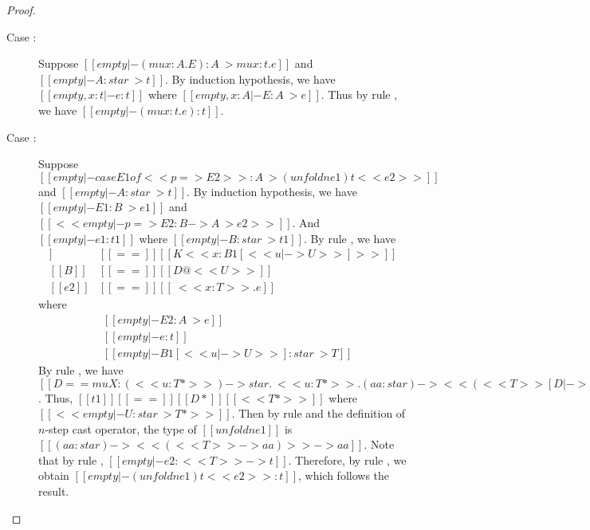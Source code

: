 \begin{proof}
\begin{description}
        \item[Case :] Suppose $[[empty |- (mu x:A . E):A ~> mu x:t.e]]$ and $[[empty |- A : star ~> t]]$. By induction hypothesis, we have $[[empty, x : t |- e : t]]$ where $[[empty, x:A |- E:A ~> e]]$. Thus by rule , we have $[[empty |- (mu x:t.e) : t]]$.
        \item[Case :] Suppose $[[empty |- case E1 of << p => E2 >> : A ~> (unfoldn e1) t <<e2>>]]$ and $[[empty |- A : star ~> t]]$. By induction hypothesis, we have $[[empty |- E1 : B ~> e1]]$ and $[[<< empty |- p => E2 : B -> A ~> e2 >>]]$. And $[[empty |- e1 : t1]]$ where $[[empty |- B : star ~> t1]]$. By rule , we have
        \begin{align*}
            [[p]] &[[==]] [[K <<x:B1[<< u |-> U >>]>>]] \\
            [[B]] &[[==]] [[D@<<U>>]] \\
            [[e2]] &[[==]] [[\ <<x:T>> .e]]
        \end{align*}
        where
        \begin{align*}
            &[[empty |- E2 : A ~> e]] \\
            &[[empty |- e : t]] \\
            &[[empty |- B1[<< u |-> U >>]:star ~> T ]]
        \end{align*}
        By rule , we have $[[D == mu X : (<<u:T*>>) -> star . \ <<u:T*>> . (aa:star) -> << (<<T>>[D |-> X] -> aa) >> -> aa]]$. Thus, $[[t1]] [[==]] [[D*]] [[<<T*>>]]$ where $[[<<empty |- U : star ~> T*>>]]$. Then by rule  and the definition of $n$-step cast operator, the type of $[[unfoldn e1]]$ is $[[(aa:star) -> << (<<T>> -> aa) >> -> aa]]$. Note that by rule , $[[empty |- e2 : <<T>> -> t]]$. Therefore, by rule , we obtain $[[empty |- (unfoldn e1) t <<e2>> : t]]$, which follows the result.
    \end{description}
\end{proof}

